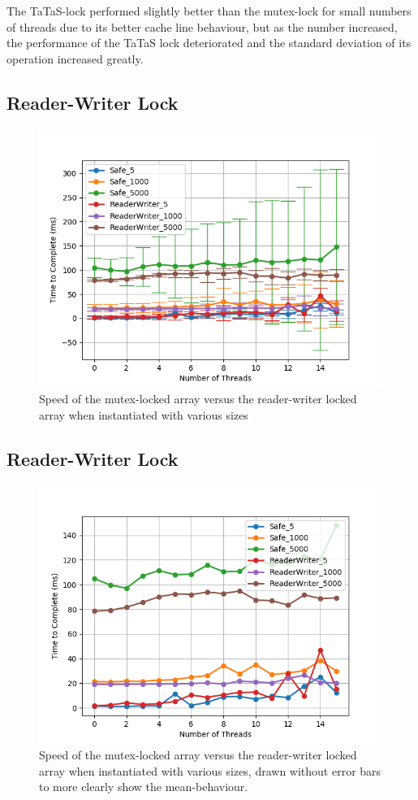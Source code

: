 \documentclass[11pt]{article}
\begin{document}
The TaTaS-lock performed slightly better than the mutex-lock for small numbers of threads due to its better cache line behaviour, but as the number increased, the performance of the TaTaS lock deteriorated and the standard deviation of its operation increased greatly.

\subsection{Reader-Writer Lock}
\begin{figure}\label{step5_1}
\centering
\includegraphics[scale=0.65]{step5_1.png}
\caption{Speed of the mutex-locked array versus the reader-writer locked array when instantiated with various sizes}
\end{figure}

\subsection{Reader-Writer Lock}
\begin{figure}\label{step5_2}
\centering
\includegraphics[scale=0.65]{step5_2.png}
\caption{Speed of the mutex-locked array versus the reader-writer locked array when instantiated with various sizes, drawn without error bars to more clearly show the mean-behaviour.}
\end{figure}
\end{document}
